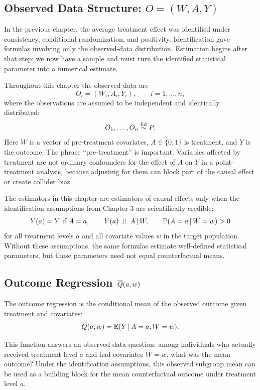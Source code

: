 \label{lec:4-1}

\subsection{Observed Data Structure: $O=(W,A,Y)$}

In the previous chapter, the average treatment effect was identified under consistency,
conditional randomization, and positivity. Identification gave formulas involving only
the observed-data distribution. Estimation begins after that step: we now have a
sample and must turn the identified statistical parameter into a numerical estimate.

Throughout this chapter the observed data are
\[
O_i=(W_i,A_i,Y_i), \qquad i=1,\ldots,n,
\]
where the observations are assumed to be independent and identically distributed:
\[
O_1,\ldots,O_n \overset{\mathrm{iid}}{\sim} P.
\]
Here $W$ is a vector of pre-treatment covariates, $A\in\{0,1\}$ is treatment, and
$Y$ is the outcome. The phrase ``pre-treatment'' is important. Variables affected by
treatment are not ordinary confounders for the effect of $A$ on $Y$ in a point-treatment
analysis, because adjusting for them can block part of the causal effect or create
collider bias.

\begin{assumptionbox}
The estimators in this chapter are estimators of causal effects only when the
identification assumptions from Chapter 3 are scientifically credible:
\[
Y(a)=Y \text{ if } A=a,\qquad
Y(a)\perp\!\!\!\perp A\,\vert\, W,\qquad
\mathbb{P}(A=a\,\vert\, W=w)>0
\]
for all treatment levels $a$ and all covariate values $w$ in the target population.
Without these assumptions, the same formulas estimate well-defined statistical
parameters, but those parameters need not equal counterfactual means.
\end{assumptionbox}

\subsection{Outcome Regression $\overline{Q}(a,w)$}

\begin{definition}
The outcome regression is the conditional mean of the observed outcome given
treatment and covariates:
\[
\overline{Q}(a,w)=\mathbb{E}(Y\,\vert\, A=a,W=w).
\]
\end{definition}

This function answers an observed-data question: among individuals who actually
received treatment level $a$ and had covariates $W=w$, what was the mean outcome?
Under the identification assumptions, this observed subgroup mean can be used as a
building block for the mean counterfactual outcome under treatment level $a$.

